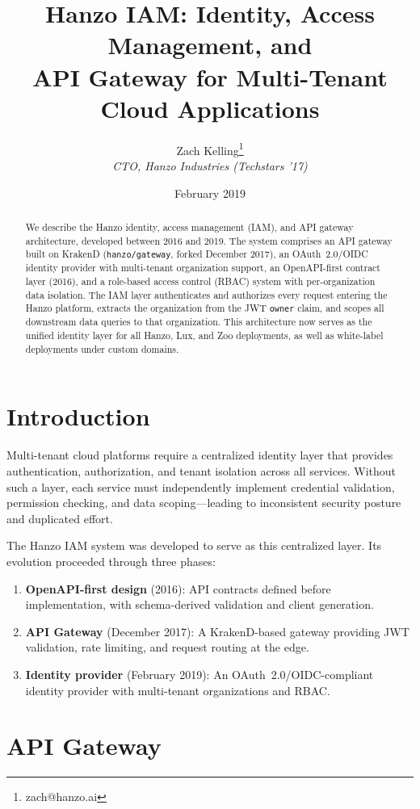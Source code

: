 \documentclass[11pt,a4paper]{article}
\title{Hanzo IAM: Identity, Access Management, and\\API Gateway for Multi-Tenant Cloud Applications}
\author{Zach Kelling\thanks{zach@hanzo.ai} \\ \textit{CTO, Hanzo Industries (Techstars '17)}}
\date{February 2019}
\begin{document}
\hanzocoverpage

\begin{abstract}
We describe the Hanzo identity, access management (IAM), and API gateway architecture, developed between 2016 and 2019. The system comprises an API gateway built on KrakenD (\texttt{hanzo/gateway}, forked December 2017), an OAuth~2.0/OIDC identity provider with multi-tenant organization support, an OpenAPI-first contract layer (2016), and a role-based access control (RBAC) system with per-organization data isolation. The IAM layer authenticates and authorizes every request entering the Hanzo platform, extracts the organization from the JWT \texttt{owner} claim, and scopes all downstream data queries to that organization. This architecture now serves as the unified identity layer for all Hanzo, Lux, and Zoo deployments, as well as white-label deployments under custom domains.
\end{abstract}

\section{Introduction}

Multi-tenant cloud platforms require a centralized identity layer that provides authentication, authorization, and tenant isolation across all services. Without such a layer, each service must independently implement credential validation, permission checking, and data scoping---leading to inconsistent security posture and duplicated effort.

The Hanzo IAM system was developed to serve as this centralized layer. Its evolution proceeded through three phases:

\begin{enumerate}
    \item \textbf{OpenAPI-first design} (2016): API contracts defined before implementation, with schema-derived validation and client generation.
    \item \textbf{API Gateway} (December 2017): A KrakenD-based gateway providing JWT validation, rate limiting, and request routing at the edge.
    \item \textbf{Identity provider} (February 2019): An OAuth~2.0/OIDC-compliant identity provider with multi-tenant organizations and RBAC.
\end{enumerate}

\section{API Gateway}
\end{document}
